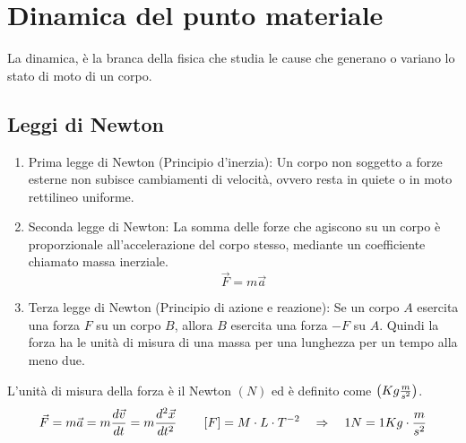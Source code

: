 \chapter{Dinamica del punto materiale} %
La dinamica, è la branca della fisica che studia le cause che generano
o variano lo stato di moto di un corpo.
\section*{Leggi di Newton}
\begin{enumerate}
    \item Prima legge di Newton (Principio d'inerzia):
    Un corpo non soggetto a forze esterne non subisce cambiamenti di velocità,
    ovvero resta in quiete o in moto rettilineo uniforme.
    \item Seconda legge di Newton:
    La somma delle forze che agiscono su un corpo è proporzionale
    all'accelerazione del corpo stesso, mediante un coefficiente chiamato
    massa inerziale.\\
    \begin{equation}
        \boxed{\vec F = m\vec a}
    \label{eq:newt2law}
    \end{equation}
    \item Terza legge di Newton (Principio di azione e reazione): Se un
    corpo $A$ esercita una forza $F$ su un corpo $B$, allora $B$ esercita
    una forza $-F$ su $A$.
    Quindi la forza ha le unità di misura di una massa per una lunghezza
    per un tempo alla meno due.    
\end{enumerate}
L'unità di misura della forza è il Newton $(N)$ ed è definito come
$\left( Kg\frac m{s^2}\right)$. 
$$ \vec F = m\vec a = m\frac{d\vec v}{dt} = m\frac{d^2\vec x}{dt^2}\quad\quad
\left[F\right] = M\cdot L\cdot T^{-2} \quad\Rightarrow\quad 1N = 1 Kg\cdot\frac m{s^2}$$





